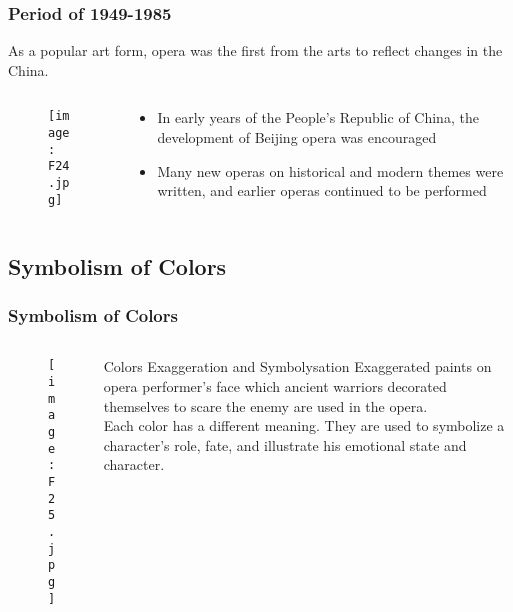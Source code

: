 \documentclass[pdflatex,compress,8pt,
	xcolor={dvipsnames,dvipsnames,svgnames,x11names,table},
	hyperref={	
	breaklinks = true, 
	pdfauthor={Lemenkova Polina}, 
	pdfsubject={Preentation}, 
	pdfcreator={Lemenkova Polina}, 
	pdfproducer={Lemenkova Polina}, 
	colorlinks=true,
	linkcolor=NavyBlue, 
	citecolor=NavyBlue, 
	urlcolor = NavyBlue, 
	breaklinks = true}]{beamer}
\begin{document}
\begin{frame}\frametitle{Period of 1949-1985}
As a popular art form, opera was the first from the arts to reflect changes in the China.
	\begin{minipage}[0.4\textheight]{\textwidth}
		\begin{columns}[T]
			\begin{column}{0.7\textwidth}
				\begin{figure}[H]
					\centering
					\texttt{[image: F24.jpg]}
				\end{figure}
			\end{column}
			\begin{column}{0.3\textwidth}
				\vspace{3em} 
				\begin{itemize}
					\item In early years of the People's Republic of China, the development of Beijing opera was encouraged
					\item Many new operas on historical and modern themes were written, and earlier operas continued to be performed
				\end{itemize}
			\end{column}
		\end{columns}
	\end{minipage}
\end{frame}

\subsection{Symbolism of Colors}
\begin{frame}\frametitle{Symbolism of Colors}
	\begin{minipage}[0.4\textheight]{\textwidth}
		\begin{columns}[T]
			\begin{column}{0.6\textwidth}
				\begin{figure}[H]
					\centering
					\texttt{[image: F25.jpg]}
				\end{figure}
			\end{column}
			\begin{column}{0.4\textwidth}
			\vspace{4em}
				\begin{alertblock}{Colors Exaggeration and Symbolysation}
	Exaggerated paints on opera performer's face which ancient warriors decorated themselves to scare the enemy are used in the opera. \\
	Each color has a different meaning. They are used to symbolize a character's role, fate, and illustrate his emotional state and character. 
				\end{alertblock}
			\end{column}
		\end{columns}
	\end{minipage}
\end{frame}
\end{document}
